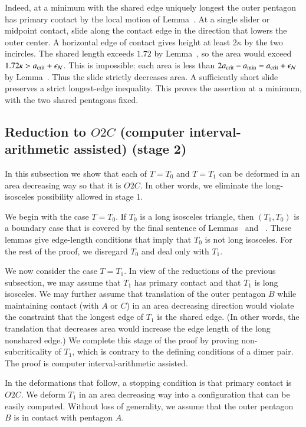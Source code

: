 Indeed, at a minimum with the shared edge uniquely longest the outer
pentagon has primary contact by the local motion of
Lemma~. At a single slider or midpoint contact, slide
along the contact edge in the direction that lowers the outer center.
A horizontal edge of contact gives height at least $2\kappa$ by the
two incircles. The shared length exceeds $1.72$ by Lemma~,
so the area would exceed $1.72\kappa>a_\text{crit}+\epsilon_{\mathcal N}$. This is impossible:
each area is less than $2a_\text{crit}-a_\text{min}=a_\text{crit}+\epsilon_{\mathcal N}$ by Lemma~.
Thus the slide strictly decreases area. A sufficiently short slide
preserves a strict longest-edge inequality. This proves the assertion
at a minimum, with the two shared pentagons fixed.

\subsection{Reduction to $O2C$ (computer interval-arithmetic assisted) (stage 2)}

In this subsection we show that each of $T=T_0$ and $T=T_1$ can be
deformed in an area decreasing way so that it is $O2C$.
In other words, we eliminate the long-isosceles possibility allowed in stage 1.

We begin with the case $T=T_0$.  If $T_0$ is a long isosceles
triangle, then $(T_1,T_0)$ is a boundary case that is covered by the
final sentence of Lemmas~ and ~.
These lemmas give edge-length conditions that imply that $T_0$ is not
long isosceles.  For the rest of the proof, we disregard $T_0$ and
deal only with $T_1$.

We now consider the case $T=T_1$.  In view of the reductions of the
previous subsection, we may assume that $T_1$ has primary contact and
that $T_1$ is long isosceles.  We may further assume that translation
of the outer pentagon $B$ while maintaining contact (with $A$ or $C$)
in an area decreasing direction would violate the constraint that the
longest edge of $T_1$ is the shared edge.  (In other words, the
translation that decreases area would increase the edge length of the
long nonshared edge.)  We complete this stage of the proof by proving
non-subcriticality of $T_1$, which is contrary to the defining
conditions of a dimer pair.  The proof is computer interval-arithmetic
assisted.

In the deformations that follow, a stopping condition is that
primary contact is $O2C$.
We deform $T_1$ in an area decreasing
way into a configuration that can be easily computed.  Without loss of
generality, we assume that the outer pentagon $B$ is in contact with
pentagon $A$.  

